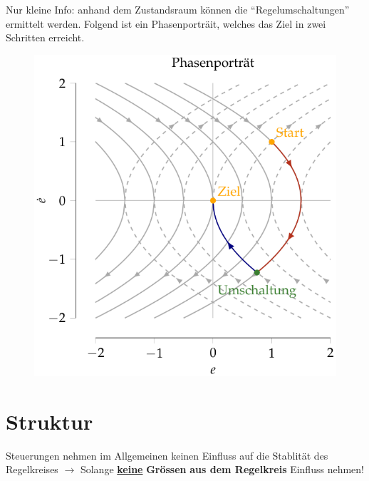 \documentclass[
  10pt,
  a4paper,
  twocolumn]{article}
\numberwithin{equation}{section}
\begin{document}
Nur kleine Info: anhand dem Zustandsraum können die
``Regelumschaltungen'' ermittelt werden. Folgend ist ein Phasenporträit,
welches das Ziel in zwei Schritten erreicht.

\begin{figure}[H]

{\centering \includegraphics{images/paste-52.png}

}

\end{figure}

\hypertarget{struktur}{%
\section{Struktur}\label{struktur}}

\begin{tcolorbox}[enhanced jigsaw, bottomtitle=1mm, title=\textcolor{quarto-callout-warning-color}{\faExclamationTriangle}\hspace{0.5em}{Steuerung \& Stabilität}, arc=.35mm, rightrule=.15mm, toprule=.15mm, opacitybacktitle=0.6, coltitle=black, bottomrule=.15mm, toptitle=1mm, colframe=quarto-callout-warning-color-frame, colbacktitle=quarto-callout-warning-color!10!white, breakable, titlerule=0mm, leftrule=.75mm, left=2mm, opacityback=0, colback=white]

Steuerungen nehmen im Allgemeinen keinen Einfluss auf die Stablität des
Regelkreises \(\rightarrow\) Solange \ul{\textbf{keine}}
\textbf{Grössen} \textbf{aus dem Regelkreis} Einfluss nehmen!

\end{tcolorbox}
\end{document}
